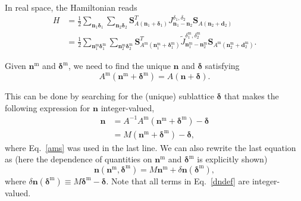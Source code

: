 \documentclass[12pt, a4paper]{article}
\newcommand{\m}{\textrm{m}}
\begin{document}
In real space, the Hamiltonian reads
\begin{align}
  H &= \frac{1}{2}\sum_{\bm{n}_1\bm{\delta}_1}\sum_{\bm{n}_2\bm{\delta}_2}\bm{S}_{A(\bm{n}_1+\bm{\delta}_1)}^T J_{\bm{n}_1-\bm{n}_2}^{\delta_1,\delta_2}\bm{S}_{A(\bm{n}_2+\bm{d}_2)}\label{rsh}\\
   &= \frac{1}{2}\sum_{\bm{n}_1^{\m}\bm{\delta}_1^{\m}}\sum_{\bm{n}_2^{\m}\bm{\delta}_2^{\m}}\bm{S}_{A^{\m}(\bm{n}_1^{\m}+\bm{\delta}_1^{\m})}^T \tilde{J}_{\bm{n}_1^{\m}-\bm{n}_2^{\m}}^{\delta_1^{\m},\delta_2^{\m}}\bm{S}_{A^{\m}(\bm{n}_2^{\m}+\bm{d}_2^{\m})}\label{rshm}.
\end{align}

Given $\bm{n}^{\m}$ and $\bm{\delta}^{\m}$, we need to find the unique $\bm{n}$ and $\bm{\delta}$ satisfying
\begin{equation}\label{ama}
  A^{\m}(\bm{n}^{\m}+\bm{\delta}^{\m})=A(\bm{n}+\bm{\delta}).
\end{equation}

This can be done by searching for the (unique) sublattice $\bm{\delta}$ that makes the following expression for $\bm{n}$ integer-valued,
\begin{align}
  \bm{n} &= A^{-1}A^{\m}(\bm{n}^{\m}+\bm{\delta}^{\m})-\bm{\delta}\\
   &= M(\bm{n}^{\m}+\bm{\delta}^{\m})-\bm{\delta},
\end{align}
where Eq.~\ref{ams} was used in the last line. We can also rewrite the last equation as (here the dependence of quantities on $\bm{n}^{\m}$ and $\bm{\delta}^{\m}$ is explicitly shown)
\begin{equation}\label{dndef}
  \bm{n}(\bm{n}^{\m},\bm{\delta}^{\m})= M\bm{n}^{\m}+\delta\bm{n}(\bm{\delta}^{\m}),
\end{equation}
where $\delta\bm{n}(\bm{\delta}^{\m})\equiv M\bm{\delta}^{\m}-\bm{\delta}$. Note that all terms in Eq.~\ref{dndef} are integer-valued.
\end{document}
